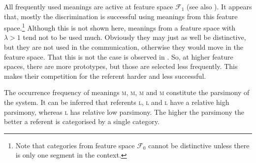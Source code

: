 All frequently used meanings are active at feature space ${\mathcal F}_1$ (see also ). It appears that, mostly the discrimination is successful using meanings from this feature space.\footnote{Note that categories from feature space ${\mathcal F}_0$ cannot be distinctive unless there is only one segment in the context.} Although this is not shown here, meanings from a feature space with $\lambda>1$ tend not to be used much. Obviously they may just as well be distinctive, but they are not used in the communication, otherwise they would move in the feature space. That this is not the case is observed in . So, at higher feature spaces, there are more prototypes, but those are selected less frequently. This makes their competition for the referent harder and less successful.

The occurrence frequency of meanings {\scshape m}, {\scshape m}, {\scshape m} and {\scshape m} constitute the parsimony of the system. It can be inferred that referents \textsc{l}, \textsc{l} and \textsc{l} have a relative high parsimony, whereas \textsc{l} has relative low parsimony. The higher the parsimony the better a referent is categorised by a single category.

